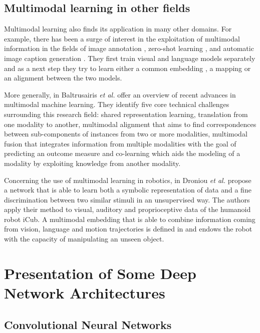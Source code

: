 \subsection{Multimodal learning in other fields}

Multimodal learning also finds its application in many other domains.
For example, there has been a surge of interest in the exploitation of
multimodal
information in the fields of image annotation \cite{J. Weston 2010},
zero-shot learning \cite{A. Frome 2013, R. Socher 2013}, and automatic
image caption generation \cite{A. Karpathy 2015}. They first train
visual and language models separately and as a next step they try
to learn either a common embedding \cite{J. Weston 2010}, a mapping
\cite{A. Frome 2013, R. Socher 2013} or an alignment \cite{A. Karpathy 2015}
between the two models.

More generally, in \cite{T. Baltrusaitis 2017} Baltrusairis \textit{et al.}
offer an overview of recent advances in multimodal machine learning.
They identify five core technical challenges surrounding this research
field: shared representation learning, translation from one modality to
another, multimodal alignment that aims to
find correspondences between sub-components of instances from two
or more modalities, multimodal fusion that integrates information
from multiple modalities with the goal of predicting an outcome measure
and co-learning which aids the modeling of a modality by exploiting
knowledge from another modality.

Concerning the use of multimodal learning in robotics, in 
\cite{A. Droniou 2014} Droniou \textit{et al.} propose a network that is
able to learn both
a symbolic representation of data and a fine discrimination between
two similar stimuli in an unsupervised way. The authors apply their method
to visual, auditory and proprioceptive data of the humanoid robot iCub.
A multimodal embedding that is able to combine information coming from
vision, language and motion trajectories is defined in \cite{J. Sung 2017}
and endows the robot with the capacity of manipulating an unseen object.

\section{Presentation of Some Deep Network Architectures}
\label{section:networks}

\subsection{Convolutional Neural Networks} \label{subsection:CNN}


